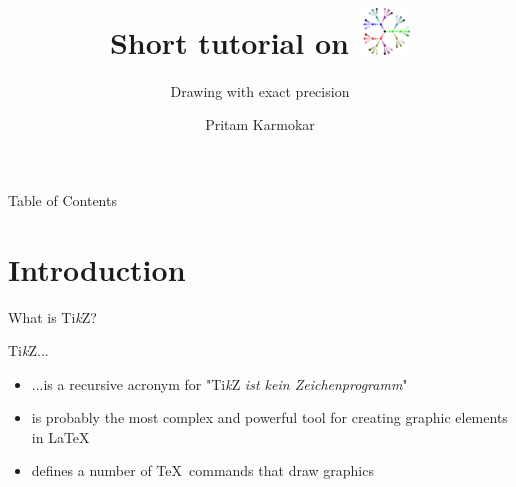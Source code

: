 \documentclass[mathserif,dvipsnames,table,xcdraw]{beamer}
\title[Short tutorial on \tz]{
	Short tutorial on \tz \includegraphics[width=0.1\textwidth]{../figures/tikz_tree.pdf}
}
\subtitle{Drawing with exact precision}
\author{\textcolor{RAISIN_BLACK}{Pritam Karmokar}}
\institute{
	\textcolor{LAVENDER_BLUE}{[Weekly Meeting 03/12/2021]}
}
\date{}
\newcommand{\tz}{Ti\textit{k}Z}
\newcommand{\redaccent}[1]{\textcolor{CERISE}{#1}}
\begin{document}
\begin{frame}
	\titlepage
\end{frame}

\begin{frame}{Table of Contents}
	\tableofcontents
\end{frame}




\section[Introduction to \tz]{Introduction}
\label{sec:introduction}

\begin{frame}{What is \tz?}
	\begin{block}{\tz ...}
		\begin{itemize}
			\item <2-> ...is a recursive acronym for "\redaccent{T}i\textit{k}Z \textit{\redaccent{i}st \redaccent{k}ein \redaccent{Z}eichenprogramm}"
			\item <3-> is probably the most complex and powerful tool for creating graphic elements in \LaTeX
			\item <4-> defines a number of \TeX\ commands that draw graphics
		\end{itemize}
	\end{block}
\end{frame}
\end{document}
